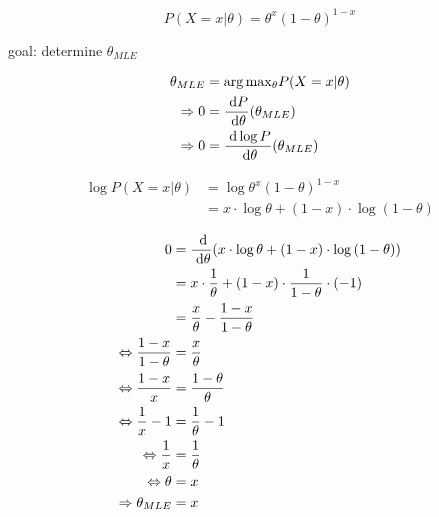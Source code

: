 \[
P(X=x|\theta) = \theta^x (1-\theta)^{1-x}
\]

goal: determine $\theta_{MLE}$

\begin{align*}
\theta_{MLE} &= \mathrm{arg}\,\mathrm{max}_\theta P(X=x|\theta) \\
\Rightarrow 0 &= \frac{\;\mathrm{d} P}{\;\mathrm{d} \theta}(\theta_{MLE}) \\
\Rightarrow 0 &= \frac{\;\mathrm{d} \log{P}}{\;\mathrm{d} \theta} (\theta_{MLE})
\end{align*}

\begin{align*}
\log P(X=x|\theta) &= \log{\theta^x (1-\theta)^{1-x}} \\
 &= x \cdot \log{\theta} + (1-x) \cdot \log{(1-\theta)}
\end{align*}

\begin{align*}
0 &= \frac{\;\mathrm{d}}{\;\mathrm{d} \theta} ( x \cdot \log{\theta} + (1-x) \cdot \log{(1-\theta)} ) \\
  &= x \cdot \frac{1}{\theta} + (1-x) \cdot \frac{1}{1-\theta} \cdot (-1) \\
  &= \frac{x}{\theta} - \frac{1-x}{1-\theta} \\
\Leftrightarrow \frac{1-x}{1-\theta} &= \frac{x}{\theta} \\
\Leftrightarrow \frac{1-x}{x} &= \frac{1-\theta}{\theta} \\
\Leftrightarrow \frac{1}{x} - 1 &= \frac{1}{\theta} - 1 \\
\Leftrightarrow \frac{1}{x} &= \frac{1}{\theta} \\
\Leftrightarrow \theta &= x \\
\Rightarrow \theta_{MLE} &= x
\end{align*}

